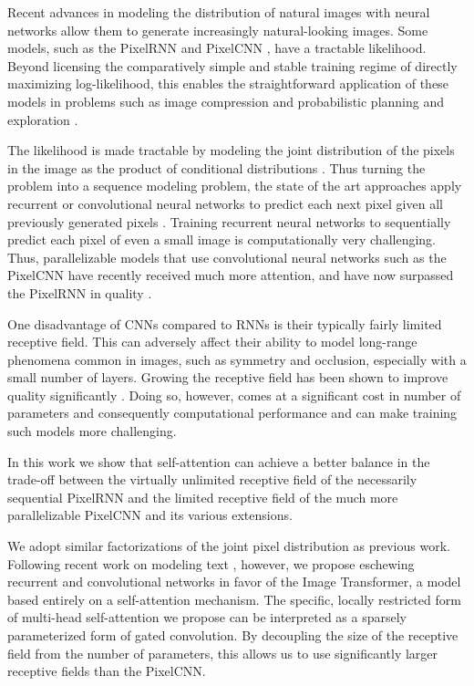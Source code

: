 Recent advances in modeling the distribution of natural images with neural networks allow them to generate increasingly natural-looking images. %
Some models, such as the PixelRNN and PixelCNN \cite{PixelRNN}, have a tractable likelihood. Beyond licensing the comparatively simple and stable training regime of directly maximizing log-likelihood, this enables the straightforward application of these models in problems such as image compression \cite{vandenoord14} and probabilistic planning and exploration \cite{Bellemarre16}.

The likelihood is made tractable by modeling the joint distribution of the pixels in the image as the product of conditional distributions \cite{larochelle2011, Theis2015}. Thus turning the problem into a sequence modeling problem, the state of the art approaches apply recurrent or convolutional neural networks to predict each next pixel given all previously generated pixels \cite{PixelRNN}. Training recurrent neural networks to sequentially predict each pixel of even a small image is computationally very challenging. Thus, parallelizable models that use convolutional neural networks such as the PixelCNN have recently received much more attention, and have now surpassed the PixelRNN in quality \cite{PixelCNN}.

One disadvantage of CNNs compared to RNNs is their typically fairly limited receptive field. This can adversely affect their ability to model long-range phenomena common in images, such as symmetry and occlusion, especially with a small number of layers. Growing the receptive field has been shown to improve quality significantly \cite{PixelCNNpp}. Doing so, however, comes at a significant cost in number of parameters and consequently computational performance and can make training such models more challenging.

In this work we show that self-attention \cite{cheng2016long, decomposableAttnModel, aiayn} can achieve a better balance in the trade-off between the virtually unlimited receptive field of the necessarily sequential PixelRNN and the limited receptive field of the much more parallelizable PixelCNN and its various extensions.

We adopt similar factorizations of the joint pixel distribution as previous work. Following recent work on modeling text \cite{aiayn}, however, we propose eschewing recurrent and convolutional networks in favor of the Image Transformer, a model based entirely on a self-attention mechanism. The specific, locally restricted form of multi-head self-attention we propose can be interpreted as a sparsely parameterized form of gated convolution. By decoupling the size of the receptive field from the number of parameters, this allows us to use significantly larger receptive fields than the PixelCNN.

